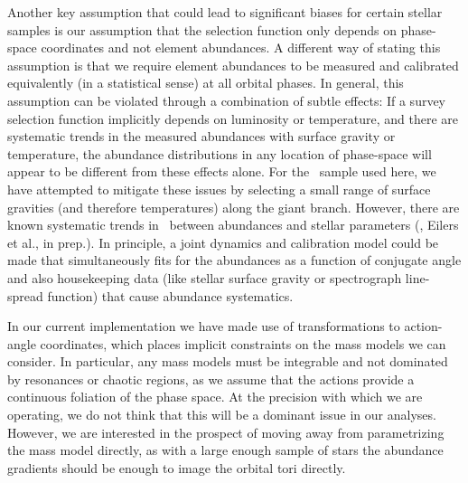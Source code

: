 \documentclass[modern]{aastex63}
\newcommand{\apogee}{\acronym{APOGEE}}
\begin{document}
Another key assumption that could lead to significant biases for certain stellar
samples is our assumption that the selection function only depends on
phase-space coordinates and not element abundances.
A different way of stating this assumption is that we require element abundances
to be measured and calibrated equivalently (in a statistical sense) at all
orbital phases.
In general, this assumption can be violated through a combination of subtle
effects: If a survey selection function implicitly depends on luminosity or
temperature, and there are systematic trends in the measured abundances with
surface gravity or temperature, the abundance distributions in any location of
phase-space will appear to be different from these effects alone.
For the \apogee\ sample used here, we have attempted to mitigate these issues by
selecting a small range of surface gravities (and therefore temperatures) along
the giant branch.
However, there are known systematic trends in \apogee\ between abundances and
stellar parameters (\citealt{Jonsson:2020, Wheeler:2020}, Eilers et al., in
prep.).
In principle, a joint dynamics and calibration model could be made that
simultaneously fits for the abundances as a function of conjugate angle and also
housekeeping data (like stellar surface gravity or spectrograph line-spread
function) that cause abundance systematics.

In our current implementation we have made use of transformations to
action-angle coordinates, which places implicit constraints on the mass models
we can consider.
In particular, any mass models must be integrable and not dominated by
resonances or chaotic regions, as we assume that the actions provide a
continuous foliation of the phase space.
At the precision with which we are operating, we do not think that this will be
a dominant issue in our analyses.
However, we are interested in the prospect of moving away from parametrizing the
mass model directly, as with a large enough sample of stars the abundance
gradients should be enough to image the orbital tori directly.
\end{document}
